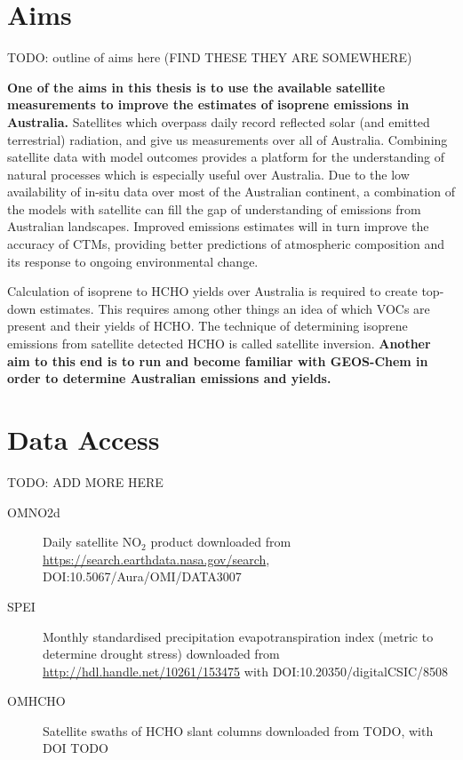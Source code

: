 \section{Aims}
\label{LR:Aims}
TODO: outline of aims here (FIND THESE THEY ARE SOMEWHERE)
  
  \textbf{One of the aims in this thesis is to use the available satellite measurements to improve the estimates of isoprene emissions in Australia.}
  Satellites which overpass daily record reflected solar (and emitted terrestrial) radiation, and give us measurements over all of Australia.
  Combining satellite data with model outcomes provides a platform for the understanding of natural processes which is especially useful over Australia.
  Due to the low availability of in-situ data over most of the Australian continent, a combination of the models with satellite can fill the gap of understanding of emissions from Australian landscapes.
  Improved emissions estimates will in turn improve the accuracy of CTMs, providing better predictions of atmospheric composition and its response to ongoing environmental change.
  
  Calculation of isoprene to HCHO yields over Australia is required to create top-down estimates.
  This requires among other things an idea of which VOCs are present and their yields of HCHO.
  The technique of determining isoprene emissions from satellite detected HCHO is called satellite inversion.
  \textbf{Another aim to this end is to run and become familiar with GEOS-Chem in order to determine Australian emissions and yields.}
  
\section{Data Access}
TODO: ADD MORE HERE
\label{LR:DataAccess}
\begin{description}
  \item[OMNO2d] Daily satellite NO$_2$ product downloaded from \url{https://search.earthdata.nasa.gov/search}, DOI:10.5067/Aura/OMI/DATA3007
  
  \item[SPEI] Monthly standardised precipitation evapotranspiration index (metric to determine drought stress) downloaded from \url{http://hdl.handle.net/10261/153475} with DOI:10.20350/digitalCSIC/8508
  
  \item[OMHCHO] Satellite swaths of HCHO slant columns downloaded from TODO, with DOI TODO
  
\end{description}